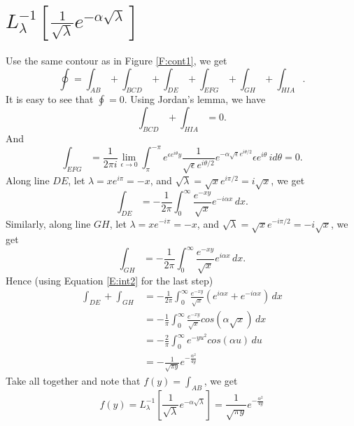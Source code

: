 \section{$ L_{\lambda}^{-1}[ 
  \frac{1}{\sqrt{\lambda}} e^{-\alpha \sqrt{\lambda}} ] $ }
Use the same contour as in Figure \ref{F:cont1}, we get
\[
  \oint = \int_{AB} + \int_{BCD} + \int_{DE} + \int_{EFG} + \int_{GH}
          + \int_{HIA}.
\]
It is easy to see that $\oint=0$. Using Jordan's lemma, we have
\[
  \int_{BCD} + \int_{HIA} = 0.
\]
And
\[
  \int_{EFG} = \frac{1}{2\pi i} \lim_{\epsilon \to 0} 
    \int_{\pi}^{-\pi} e^{\epsilon e^{i\theta} y}
    \frac{1}{\sqrt{\epsilon} e^{i\theta/2}}
    e^{-\alpha \sqrt{\epsilon} e^{i\theta/2}}
    \epsilon e^{i\theta} \, i d\theta
  = 0. 
\]
Along line $DE$, let $\lambda=x e^{i\pi}=-x$, and 
$\sqrt{\lambda}=\sqrt{x} e^{i\pi/2}=i\sqrt{x}$, we get
\[
  \int_{DE} = -\frac{1}{2\pi} \int_0^{\infty} \frac{e^{-xy}}{\sqrt{x}}
              e^{-i\alpha x} \, dx.
\]
Similarly, along line $GH$, let $\lambda=x e^{-i\pi}=-x$, and 
$\sqrt{\lambda}=\sqrt{x} e^{-i\pi/2}=-i\sqrt{x}$, we get
\[
  \int_{GH} = -\frac{1}{2\pi} \int_0^{\infty} \frac{e^{-xy}}{\sqrt{x}}
              e^{i\alpha x} \, dx.
\]
Hence (using Equation \ref{E:int2} for the last step)
\begin{align*}
  \int_{DE} + \int_{GH} 
    &= -\frac{1}{2\pi} \int_0^{\infty} \frac{e^{-xy}}{\sqrt{x}}
       \left( e^{i\alpha x} + e^{-i\alpha x} \right) \, dx \\
    &= -\frac{1}{\pi} \int_0^{\infty} \frac{e^{-xy}}{\sqrt{x}}
         cos(\alpha \sqrt{x}) \, dx   \\
    &= - \frac{2}{\pi} \int_0^{\infty} e^{-yu^2} cos(\alpha u) \, du  \\
    &= - \frac{1}{\sqrt{\pi y}} e^{-\frac{\alpha^2}{4y}}
\end{align*}
Take all together and note that $f(y)=\int_{AB}$, we get
\begin{equation} \label{E:ilt2}
  f(y) = L_{\lambda}^{-1} 
         \left[ 
           \frac{1}{\sqrt{\lambda}} e^{-\alpha \sqrt{\lambda}}
         \right]
    = \frac{1}{\sqrt{\pi y}} e^{ -\frac{\alpha^2}{4y} } 
\end{equation}


